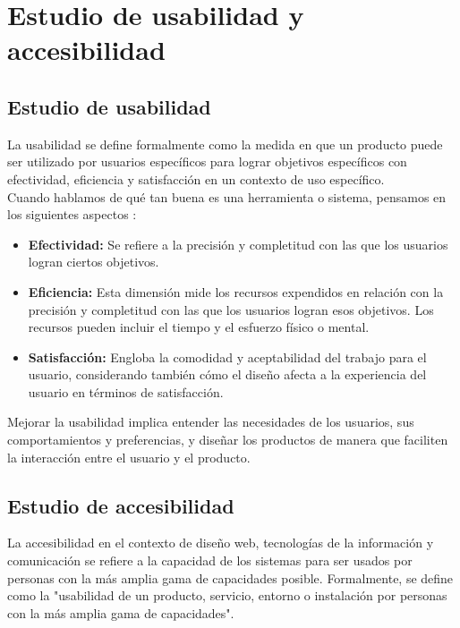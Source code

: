 \newpage

\section{Estudio de usabilidad y accesibilidad}

\subsection{Estudio de usabilidad}

La usabilidad se define formalmente como la medida en que un producto puede ser utilizado por usuarios específicos para lograr objetivos específicos con efectividad, eficiencia y satisfacción en un contexto de uso específico. \cite{iso} \\ 

Cuando hablamos de qué tan buena es una herramienta o sistema, pensamos en los siguientes aspectos \cite{fernandez2018usabilidad}:

\begin{itemize}
	\item \textbf{Efectividad: } Se refiere a la precisión y completitud con las que los usuarios logran ciertos objetivos.
	\item \textbf{Eficiencia: } Esta dimensión mide los recursos expendidos en relación con la precisión y completitud con las que los usuarios logran esos objetivos. Los recursos pueden incluir el tiempo y el esfuerzo físico o mental.
	\item \textbf{Satisfacción: } Engloba la comodidad y aceptabilidad del trabajo para el usuario, considerando también cómo el diseño afecta a la experiencia del usuario en términos de satisfacción.	
\end{itemize}

Mejorar la usabilidad implica entender las necesidades de los usuarios, sus comportamientos y preferencias, y diseñar los productos de manera que faciliten la interacción entre el usuario y el producto.

\subsection{Estudio de accesibilidad}

La accesibilidad en el contexto de diseño web, tecnologías de la información y comunicación se refiere a la capacidad de los sistemas para ser usados por personas con la más amplia gama de capacidades posible. Formalmente, se define como la "usabilidad de un producto, servicio, entorno o instalación por personas con la más amplia gama de capacidades". \cite{accesibilidad} \\

